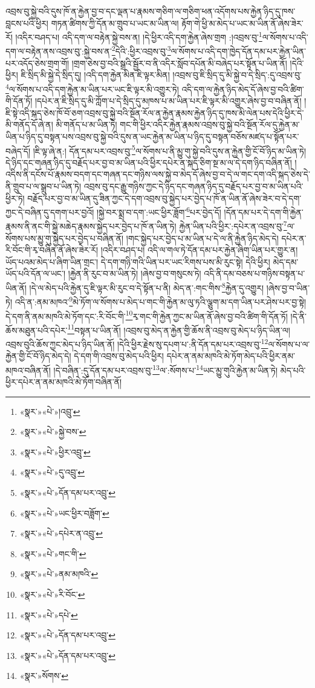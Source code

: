 འབྲས་བུ་སྐྱེ་བའི་དུས་ཁོ་ན་རྐྱེན་བྱ་བ་དང་ལྡན་པ་རྣམས་གཅིག་ལ་གཅིག་ཕན་འདོགས་པས་རྐྱེན་ཉིད་དུ་ཁས་བླངས་པའི་ཕྱིར། གཏན་ཚིགས་ཀྱི་དོན་མ་གྲུབ་པ་ཡང་མ་ཡིན་ལ། རྟོག་གེ་ཕྱི་མ་མེད་པ་ཡང་མ་ཡིན་ནོ་ཞེས་ཟེར་རོ། །འདིར་བཤད་པ། འདི་དག་ལ་བརྟེན་སྐྱེ་བས་ན། །དེ་ཕྱིར་འདི་དག་རྐྱེན་ཞེས་གྲག :།འབྲས་བུ་\footnote{«སྣར་»«པེ་»།འབྲུ་}ལ་སོགས་པ་འདི་དག་ལ་བརྟེན་ནས་འབྲས་བུ་:སྐྱེ་བས་ན་\footnote{«སྣར་»«པེ་»སྐྱེ་བས་}དེའི་:ཕྱིར་འབྲས་བུ་\footnote{«སྣར་»«པེ་»ཕྱིར་འབྲུ་}ལ་སོགས་པ་འདི་དག་ཁྱེད་དོན་དམ་པར་རྐྱེན་ཡིན་པར་འདོད་ཅེས་གྲག་གོ། །གྲག་ཅེས་བྱ་བའི་སྒྲའི་སྦྱོར་བ་ནི་འདིར་སློབ་དཔོན་མི་བཞེད་པར་སྟོན་པ་ཡིན་ནོ། །དེའི་ཕྱིར། ཇི་སྲིད་མི་སྐྱེ་དེ་སྲིད་དུ། །འདི་དག་རྐྱེན་མིན་ཇི་ལྟར་མིན། །འབྲས་བུ་ཇི་སྲིད་དུ་མི་སྐྱེ་བ་དེ་སྲིད་:དུ་འབྲས་བུ་\footnote{«སྣར་»«པེ་»དུ་འབྲུ་}ལ་སོགས་པ་འདི་དག་རྐྱེན་མ་ཡིན་པར་ཡང་ཇི་ལྟར་མི་འགྱུར་ཏེ། འདི་དག་ལ་རྐྱེན་ཉིད་མེད་དོ་ཞེས་བྱ་བའི་ཚིག་གི་དོན་ཏོ། །དཔེར་ན་ཇི་སྲིད་དུ་མི་ཀློག་པ་དེ་སྲིད་དུ་མཁས་པ་མ་ཡིན་པར་ཇི་ལྟར་མི་འགྱུར་ཞེས་བྱ་བ་བཞིན་ནོ། །ཇི་སྟེ་འདི་སྐད་ཅེས་ཁོ་བོ་ཅག་འབྲས་བུ་སྐྱེ་བའི་སྔོན་རོལ་ན་རྐྱེན་རྣམས་རྐྱེན་ཉིད་དུ་ཁས་མི་ལེན་པས་དེའི་ཕྱིར་དེ་མི་གནོད་དོ་ཞེ་ན། མི་གནོད་པ་མ་ཡིན་ཏེ། གང་གི་ཕྱིར་འདིར་རྐྱེན་རྣམས་འབྲས་བུ་སྐྱེ་བའི་སྔོན་རོལ་དུ་རྐྱེན་མ་ཡིན་པ་ཉིད་དུ་བསྟན་པས་འབྲས་བུ་སྐྱེ་བའི་དུས་ན་ཡང་རྐྱེན་མ་ཡིན་པ་ཉིད་དུ་བསྟན་བཅོས་མཛད་པ་སྟོན་པར་བཞེད་དོ། །ཇི་ལྟ་ཞེ་ན:། དོན་དམ་པར་འབྲས་བུ་\footnote{«སྣར་»«པེ་»དོན་དམ་པར་འབྲུ་}ལ་སོགས་པ་ནི་མྱུ་གུ་སྐྱེ་བའི་དུས་ན་རྐྱེན་གྱི་ངོ་བོ་ཉིད་མ་ཡིན་ཏེ། དེ་ཉིད་དང་གཞན་ཉིད་དུ་བརྗོད་པར་བྱ་བ་མ་ཡིན་པའི་ཕྱིར་དཔེར་ན་སྐད་ཅིག་སྔ་མ་ལ་དེ་དག་ཉིད་བཞིན་ནོ། །འདིས་ནི་དངོས་པོ་རྣམས་བདག་དང་གཞན་དང་གཉིས་ལས་སྐྱེ་བ་མེད་དོ་ཞེས་བྱ་བ་དེ་ལ་གང་དག་འདི་སྐད་ཅེས་དེ་ནི་གྲུབ་པ་ལ་སྒྲུབ་པ་ཡིན་ཏེ། འབྲས་བུ་དང་རྒྱུ་གཉིས་ཀྱང་དེ་ཉིད་དང་གཞན་ཉིད་དུ་བརྗོད་པར་བྱ་བ་མ་ཡིན་པའི་ཕྱིར་ཏེ། བརྗོད་པར་བྱ་བ་མ་ཡིན་དུ་ཟིན་ཀྱང་དེ་དག་འབྲས་བུ་སྐྱེད་པར་བྱེད་པ་ཁོ་ན་ཡིན་ནོ་ཞེས་ཟེར་བ་དེ་དག་ཀྱང་དེ་བཞིན་དུ་དགག་པར་བྱའོ། །སྐྱེ་བར་སྨྲ་བ་དག་:ཡང་ཕྱིར་ཟློག་\footnote{«སྣར་»«པེ་»ཡང་ཕྱིར་བཟློག་}པར་བྱེད་དོ། །དོན་དམ་པར་དེ་དག་གི་རྐྱེན་རྣམས་ནི་ནང་གི་སྐྱེ་མཆེད་རྣམས་སྐྱེད་པར་བྱེད་པ་ཁོ་ན་ཡིན་ཏེ། རྐྱེན་ཡིན་པའི་ཕྱིར་:དཔེར་ན་འབྲས་བུ་\footnote{«སྣར་»«པེ་»དཔེར་ན་འབྲུ་}ལ་སོགས་པས་མྱུ་གུ་སྐྱེད་པར་བྱེད་པ་བཞིན་ནོ། །གང་སྐྱེད་པར་བྱེད་པ་མ་ཡིན་པ་དེ་ལ་ནི་རྐྱེན་ཉིད་མེད་དེ། དཔེར་ན་རི་བོང་གི་རྭ་བཞིན་ནོ་ཞེས་ཟེར་རོ། །འདིར་བཤད་པ། འདི་ལ་གལ་ཏེ་དོན་དམ་པར་རྐྱེན་ཞིག་ཡིན་པར་གྱུར་ན། ཡོད་པའམ་མེད་པ་ཞིག་ཡིན་གྲང་། དེ་དག་གཉི་གའི་ཡིན་པར་ཡང་རིགས་པས་མི་རུང་སྟེ། དེའི་ཕྱིར། མེད་དམ་ཡོད་པའི་དོན་ལ་ཡང་། །རྐྱེན་ནི་རུང་བ་མ་ཡིན་ཏེ། །ཞེས་བྱ་བ་གསུངས་ཏེ། འདི་ནི་དམ་བཅས་པ་གཉིས་བསྟན་པ་ཡིན་ནོ། །དེ་ལ་མེད་པའི་རྐྱེན་དུ་ཇི་ལྟར་མི་རུང་བ་དེ་སྟོན་པ་ནི། མེད་ན་:གང་གིས་\footnote{«སྣར་»«པེ་»གང་གི་}རྐྱེན་དུ་འགྱུར། །ཞེས་བྱ་བ་ཡིན་ཏེ། འདི་ན་:ནམ་མཁའ་\footnote{«སྣར་»«པེ་»ནམ་མཁའི་}མེ་ཏོག་ལ་སོགས་པ་མེད་པ་གང་གི་རྐྱེན་མ་ལུ་ཏའི་ལྕུག་མ་དག་ཡིན་པར་ཤེས་པར་བྱ་སྟེ། དེ་དག་ནི་ནམ་མཁའི་མེ་ཏོག་དང་:རི་བོང་གི་\footnote{«སྣར་»«པེ་»རི་བོང་}རྭ་གང་གི་རྐྱེན་ཀྱང་མ་ཡིན་ནོ་ཞེས་བྱ་བའི་ཚིག་གི་དོན་ཏོ། །དེ་ནི་ཆོས་མཐུན་པའི་དཔེར་\footnote{«སྣར་»«པེ་»དཔེ་}བསྟན་པ་ཡིན་ནོ། །འབྲས་བུ་མེད་ན་རྐྱེན་གྱི་ཆོས་ནི་འབྲས་བུ་མེད་པ་ཉིད་ཡིན་ལ། འབྲས་བུའི་ཆོས་ཀྱང་མེད་པ་ཉིད་ཡིན་ནོ། །དེའི་ཕྱིར་རྗེས་སུ་དཔག་པ་:ནི་དོན་དམ་པར་འབྲས་བུ་\footnote{«སྣར་»«པེ་»དོན་དམ་པར་འབྲུ་}ལ་སོགས་པ་ལ་རྐྱེན་གྱི་ངོ་བོ་ཉིད་མེད་དེ། དེ་དག་གི་འབྲས་བུ་མེད་པའི་ཕྱིར། དཔེར་ན་ནམ་མཁའི་མེ་ཏོག་མེད་པའི་ཕྱིར་ནམ་མཁའ་བཞིན་ནོ། །དེ་བཞིན་:དུ་དོན་དམ་པར་འབྲས་བུ་\footnote{«སྣར་»«པེ་»དོན་དམ་པར་འབྲུ་}ལ་:སོགས་པ་\footnote{«སྣར་»སོགས་}ཡང་མྱུ་གུའི་རྐྱེན་མ་ཡིན་ཏེ། མེད་པའི་ཕྱིར་དཔེར་ན་ནམ་མཁའི་མེ་ཏོག་བཞིན་ནོ། 